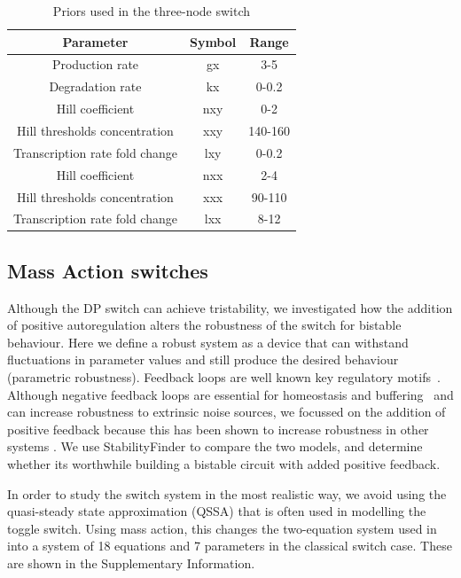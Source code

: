 \begin{table}[htpb]
\centering
\caption{Priors used in the three-node switch}
\label{tab:multi_priors}
\begin{tabular}{@{}ccc@{}}
\toprule
Parameter                           & Symbol & Range   \\ \midrule
Production rate                & gx        & 3-5    \\
Degradation rate               & kx        & 0-0.2     \\
Hill coefficient               & nxy       & 0-2    \\
Hill thresholds concentration  & xxy       & 140-160 \\
Transcription rate fold change & lxy       & 0-0.2     \\
Hill coefficient               & nxx       & 2-4     \\
Hill thresholds concentration  & xxx       & 90-110  \\
Transcription rate fold change & lxx       & 8-12    \\ \bottomrule
\end{tabular}
\end{table}


\subsection{Mass Action switches}						
Although the DP switch can achieve tristability, we investigated how the addition of positive autoregulation alters the robustness of the switch for bistable behaviour. Here we define a robust system as a device that can withstand fluctuations in parameter values and still produce the desired behaviour (parametric robustness). Feedback loops are well known key regulatory motifs~\autocite{Brandman:2005ci}. Although negative feedback loops are essential for homeostasis and buffering~\autocite{Thomas:1995id} and can increase robustness to extrinsic noise sources, we focussed on the addition of positive feedback because this has been shown to increase robustness in other systems \autocite{XXX}. We use StabilityFinder to compare the two models, and determine whether its worthwhile building a bistable circuit with added positive feedback.
\par
In order to study the switch system in the most realistic way, we avoid using the quasi-steady state approximation (QSSA) that is often used in modelling the toggle switch. Using mass action, this changes the two-equation system used in~\textcite{Lu:2014kc}~\autocite{Lu:2014kc} into a system of 18 equations and 7 parameters in the classical switch case. These are shown in the Supplementary Information.%

